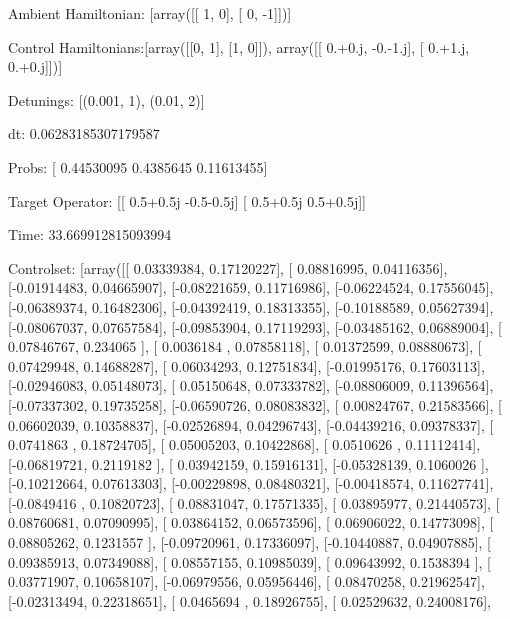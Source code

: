 \documentclass{article}
\begin{document}
    

\newpage

Ambient Hamiltonian: [array([[ 1,  0],
       [ 0, -1]])]

Control Hamiltonians:[array([[0, 1],
       [1, 0]]), array([[ 0.+0.j, -0.-1.j],
       [ 0.+1.j,  0.+0.j]])]

Detunings: [(0.001, 1), (0.01, 2)]

 dt: 0.06283185307179587

Probs: [ 0.44530095  0.4385645   0.11613455]

Target Operator: [[ 0.5+0.5j -0.5-0.5j]
 [ 0.5+0.5j  0.5+0.5j]]

Time: 33.669912815093994

Controlset: [array([[ 0.03339384,  0.17120227],
       [ 0.08816995,  0.04116356],
       [-0.01914483,  0.04665907],
       [-0.08221659,  0.11716986],
       [-0.06224524,  0.17556045],
       [-0.06389374,  0.16482306],
       [-0.04392419,  0.18313355],
       [-0.10188589,  0.05627394],
       [-0.08067037,  0.07657584],
       [-0.09853904,  0.17119293],
       [-0.03485162,  0.06889004],
       [ 0.07846767,  0.234065  ],
       [ 0.0036184 ,  0.07858118],
       [ 0.01372599,  0.08880673],
       [ 0.07429948,  0.14688287],
       [ 0.06034293,  0.12751834],
       [-0.01995176,  0.17603113],
       [-0.02946083,  0.05148073],
       [ 0.05150648,  0.07333782],
       [-0.08806009,  0.11396564],
       [-0.07337302,  0.19735258],
       [-0.06590726,  0.08083832],
       [ 0.00824767,  0.21583566],
       [ 0.06602039,  0.10358837],
       [-0.02526894,  0.04296743],
       [-0.04439216,  0.09378337],
       [ 0.0741863 ,  0.18724705],
       [ 0.05005203,  0.10422868],
       [ 0.0510626 ,  0.11112414],
       [-0.06819721,  0.2119182 ],
       [ 0.03942159,  0.15916131],
       [-0.05328139,  0.1060026 ],
       [-0.10212664,  0.07613303],
       [-0.00229898,  0.08480321],
       [-0.00418574,  0.11627741],
       [-0.0849416 ,  0.10820723],
       [ 0.08831047,  0.17571335],
       [ 0.03895977,  0.21440573],
       [ 0.08760681,  0.07090995],
       [ 0.03864152,  0.06573596],
       [ 0.06906022,  0.14773098],
       [ 0.08805262,  0.1231557 ],
       [-0.09720961,  0.17336097],
       [-0.10440887,  0.04907885],
       [ 0.09385913,  0.07349088],
       [ 0.08557155,  0.10985039],
       [ 0.09643992,  0.1538394 ],
       [ 0.03771907,  0.10658107],
       [-0.06979556,  0.05956446],
       [ 0.08470258,  0.21962547],
       [-0.02313494,  0.22318651],
       [ 0.0465694 ,  0.18926755],
       [ 0.02529632,  0.24008176],
\end{document}
